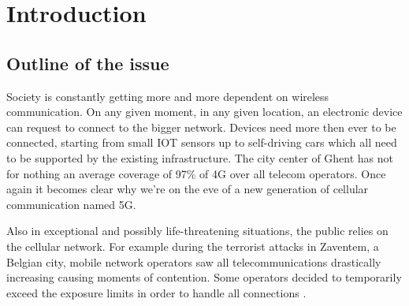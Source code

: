 %

\chapter{Introduction}
\label{chap:intro}

\section{Outline of the issue} %
\label{sec:issue}

Society is constantly getting more and more dependent on wireless communication. On any given moment, in any given location, an electronic device
can request to connect to the bigger network. Devices need more then ever to be connected, starting from small IOT sensors up to self-driving cars
which all need to be supported by the existing infrastructure. The city center of Ghent has not for nothing an average coverage of 97\% of 4G 
over all telecom operators\cite{testaankoop}. Once again it becomes clear why we're on the eve of a new generation of cellular communication named 5G. 

Also in exceptional and possibly life-threatening situations, the public relies on the cellular network. For example during the terrorist attacks in Zaventem, a Belgian city,
mobile network operators saw all telecommunications drastically increasing causing moments of contention. Some operators decided to temporarily exceed the exposure limits in
order to handle all connections \cite{baseZaventem}.

